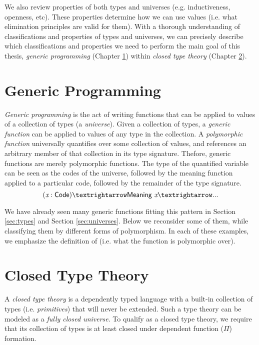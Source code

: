 \documentclass[12pt]{report}
\newcommand{\refch}[1]{Chapter \ref{ch:#1}}
\newcommand{\refsec}[1]{Section \ref{sec:#1}}
\newcommand{\AgdaFun}[1]{\AgdaFunction{#1}}
\newcommand{\AgdaVar}[1]{\AgdaBound{#1}}
\theoremstyle{definition}
\theoremstyle{remark}
\numberwithin{definition}{section}
\numberwithin{equation}{section}
\numberwithin{proposition}{section}
\numberwithin{conjecture}{section}
\numberwithin{theorem}{section}
\numberwithin{lemma}{section}
\numberwithin{corollary}{section}
\numberwithin{example}{section}
\numberwithin{remark}{section}
\begin{document}
We also review properties of both types and universes
(e.g. inductiveness, openness, etc). These properties determine how we
can use values (i.e. what elimination principles are valid for them).
With a thorough understanding of classifications and
properties of types and universes, we can precisely describe which
classifications and properties we need to perform the main goal of
this thesis, \textit{generic programming} (\refch{generic}) within
\textit{closed type theory} (\refch{closedtt}).




\chapter{Generic Programming}\label{ch:generic}

\textit{Generic programming} is the act of writing
functions that can be applied to values of a collection of types
(a \textit{universe}).
Given a collection of types, a \textit{generic function} can be
applied to values of any type in the collection. A
\textit{polymorphic function} universally
quantifies over some collection of values, and references an arbitrary
member of that collection in its type signature. Thefore, generic
functions are merely polymorphic functions.
The type of the quantified variable can be seen as the codes of the
universe, followed by the meaning function applied to a particular
code, followed by the remainder of the type signature.
$$
(\AgdaVar{x} : \AgdaFun{Code}) → \AgdaFun{Meaning}~\AgdaVar{x} → ...
$$

We have already seen many generic functions fitting this pattern in
\refsec{types} and \refsec{universes}. Below we reconsider some of
them, while classifying them by different forms of polymorphism. In
each of these examples, we emphasize the definition of
\AgdaFun{Code} (i.e. what the function is polymorphic over).






\chapter{Closed Type Theory}\label{ch:closedtt}

A \textit{closed type theory} is a dependently typed language with a
built-in collection of types
(i.e. \textit{primitives}) that will never be extended.
Such a type
theory can be modeled as a \textit{fully closed universe}. To qualify
as a closed type theory, we require that its collection of types is at
least closed under dependent function ($\Pi$) formation.
\end{document}
